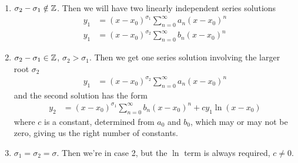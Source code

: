 \documentclass{../../template/note}
\begin{document}
    \begin{enumerate}[label=\protect\circled{\arabic*}]
        \item \(\sigma_2 - \sigma_1 \notin \mathbb Z\). Then we will have two linearly independent series solutions
        \begin{align*}
            y_1 &= (x-x_0)^{\sigma_1}\sum_{n=0}^\infty a_n(x-x_0)^n \\
            y_1 &= (x-x_0)^{\sigma_2}\sum_{n=0}^\infty b_n(x-x_0)^n
        \end{align*}
        \item \(\sigma_2 - \sigma_1 \in \mathbb Z\), \(\sigma_2 > \sigma_1\). Then we get one series solution involving the larger root \(\sigma_2\)
        \begin{align*}
            y_1 &= (x-x_0)^{\sigma_2}\sum_{n=0}^\infty a_n(x-x_0)^n
        \end{align*}
        and the second solution has the form
        \begin{align*}
            y_2 &= (x-x_0)^{\sigma_1}\sum_{n=0}^\infty b_n(x-x_0)^n + cy_1\ln(x-x_0)
        \end{align*}
        where \(c\) is a constant, determined from \(a_0\) and \(b_0\), which may or may not be zero, giving us the right number of constants.
        \item \(\sigma_1=\sigma_2=\sigma\). Then we're in case 2, but the \(\ln\) term is always required, \(c \neq 0\).
    \end{enumerate}
    
\end{document}
